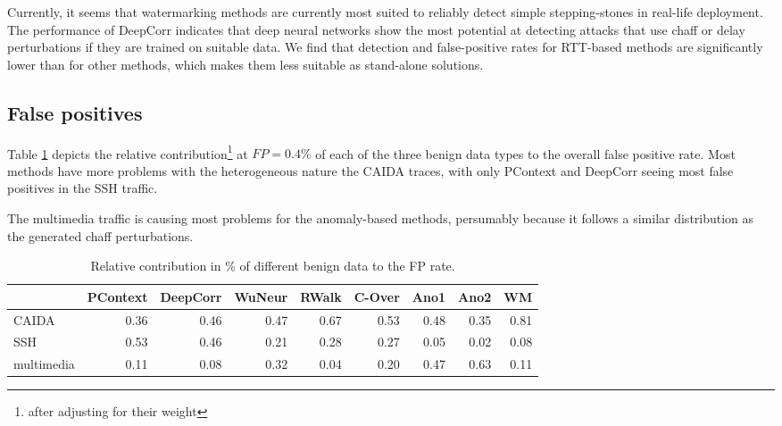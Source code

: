 \documentclass[runningheads,11pt]{llncs}\usepackage[]{graphicx}\usepackage[]{color}
\begin{document}
Currently, it seems that watermarking methods are currently most suited to reliably detect simple stepping-stones in real-life deployment. The performance of DeepCorr indicates that deep neural networks show the most potential at detecting attacks that use chaff or delay perturbations if they are trained on suitable data. We find that detection and false-positive rates for RTT-based methods are significantly lower than for other methods, which makes them less suitable as stand-alone solutions.


%



\appendix


\subsection{False positives}\label{Sec:FPana}

Table \ref{Tab:dfFP} depicts the relative contribution\footnote{after adjusting for their weight} at $FP=0.4\%$ of each of the three benign data types to the overall false positive rate. Most methods have more problems with the heterogeneous nature the CAIDA traces, with only PContext and DeepCorr seeing most false positives in the SSH traffic. 

The multimedia traffic is causing most problems for the anomaly-based methods, persumably because it follows a similar distribution as the generated chaff perturbations.
\begin{table}
\centering
\begin{tabular}{l|r|r|r|r|r|r|r|r}
  \hline
 & PContext & DeepCorr & WuNeur & RWalk & C-Over & Ano1 & Ano2 & WM \\ 
  \hline
CAIDA & 0.36 & 0.46 & 0.47 & 0.67 & 0.53 & 0.48 & 0.35 & 0.81 \\ 
  SSH & 0.53 & 0.46 & 0.21 & 0.28 & 0.27 & 0.05 & 0.02 & 0.08 \\ 
  multimedia & 0.11 & 0.08 & 0.32 & 0.04 & 0.20 & 0.47 & 0.63 & 0.11 \\ 
   \hline
\end{tabular}

\caption{Relative contribution in \% of different benign data to the FP rate.}\label{Tab:dfFP}
\end{table}


\end{document}
